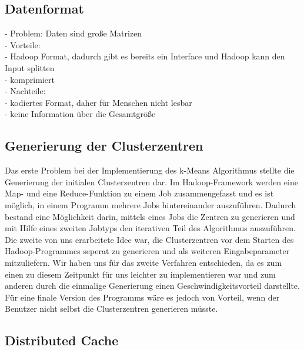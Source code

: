 \documentclass[a4paper]{llncs}
\begin{document}
\subsection{Datenformat}
- Problem: Daten sind große Matrizen\\
- Vorteile:\\
    - Hadoop Format, dadurch gibt es bereits ein Interface und Hadoop kann den Input splitten\\
    - komprimiert\\
- Nachteile:\\
    - kodiertes Format, daher für Menschen nicht lesbar\\
    - keine Information über die Gesamtgröße

\subsection{Generierung der Clusterzentren}
Das erste Problem bei der Implementierung des k-Means Algorithmus stellte die Generierung der initialen Clusterzentren dar. Im Hadoop-Framework werden eine Map- und eine Reduce-Funktion zu einem Job zusammengefasst und es ist möglich, in einem Programm mehrere Jobs hintereinander auszuführen. Dadurch bestand eine Möglichkeit darin, mittels eines Jobs die Zentren zu generieren und mit Hilfe eines zweiten Jobtyps den iterativen Teil des Algorithmus auszuführen. Die zweite von uns erarbeitete Idee war, die Clusterzentren vor dem Starten des Hadoop-Programmes seperat zu generieren und als weiteren Eingabeparameter mitzuliefern. Wir haben uns für das zweite Verfahren entschieden, da es zum einen zu diesem Zeitpunkt für uns leichter zu implementieren war und zum anderen durch die einmalige Generierung einen Geschwindigkeitsvorteil darstellte. Für eine finale Version des Programms wäre es jedoch von Vorteil, wenn der Benutzer nicht selbst die Clusterzentren generieren müsste.


\subsection{Distributed Cache}
\end{document}
